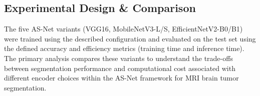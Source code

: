 \subsection{Experimental Design \& Comparison}
The five AS-Net variants (VGG16, MobileNetV3-L/S, EfficientNetV2-B0/B1) were trained using the described configuration and evaluated on the test set using the defined accuracy and efficiency metrics (training time and inference time). The primary analysis compares these variants to understand the trade-offs between segmentation performance and computational cost associated with different encoder choices within the AS-Net framework for MRI brain tumor segmentation.
